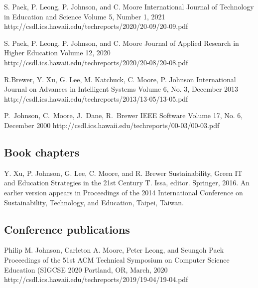 \documentclass[11pt,letterpaper,sans]{moderncv} %
\begin{document}
          {S. Paek, P. Leong, P. Johnson, and C. Moore}
          {International Journal of Technology in Education and Science}
          {Volume 5, Number 1, 2021}
          {http://csdl.ics.hawaii.edu/techreports/2020/20-09/20-09.pdf}

          {S. Paek, P. Leong, P. Johnson, and C. Moore}
          {Journal of Applied Research in Higher Education}
          {Volume 12, 2020}
          {http://csdl.ics.hawaii.edu/techreports/2020/20-08/20-08.pdf}

{R.Brewer, Y. Xu, G. Lee, M. Katchuck, C. Moore, P. Johnson}
{International Journal on Advances in Intelligent Systems}
{Volume 6, No. 3, December 2013}
{http://csdl.ics.hawaii.edu/techreports/2013/13-05/13-05.pdf}

{P.~Johnson, C.~Moore, J.~Dane, R.~Brewer}
{IEEE Software}
{Volume 17, No. 6, December 2000}
{http://csdl.ics.hawaii.edu/techreports/00-03/00-03.pdf}


\subsection{Book chapters}

          {Y. Xu, P.  Johnson, G. Lee, C. Moore, and R. Brewer}
          {Sustainability, Green IT and Education Strategies in the 21st Century}
          {T. Issa, editor.  Springer, 2016.  An earlier version appears in Proceedings of the 2014 International Conference on Sustainability, Technology, and Education, Taipei, Taiwan.}

\subsection{Conference publications}

          {Philip M. Johnson, Carleton A. Moore, Peter Leong, and Seungoh Paek}
          {Proceedings of the 51st ACM Technical Symposium on Computer Science Education (SIGCSE 2020}
          {Portland, OR, March, 2020}
          {http://csdl.ics.hawaii.edu/techreports/2019/19-04/19-04.pdf}
\end{document}
